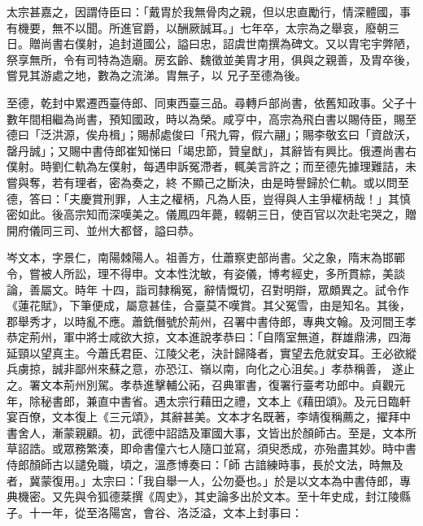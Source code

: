 \begin{pinyinscope}
 太宗甚嘉之，因謂侍臣曰：「戴胄於我無骨肉之親，但以忠直勵行，情深體國，事有機要，無不以聞。所進官爵，以酬厥誠耳。」七年卒，太宗為之舉哀，廢朝三日。贈尚書右僕射，追封道國公，謚曰忠，詔虞世南撰為碑文。又以胄宅宇弊陋，祭享無所，令有司特為造廟。房玄齡、魏徵並美胄才用，俱與之親善，及胄卒後，嘗見其游處之地，數為之流涕。胄無子，以
 兄子至德為後。



 至德，乾封中累遷西臺侍郎、同東西臺三品。尋轉戶部尚書，依舊知政事。父子十數年間相繼為尚書，預知國政，時以為榮。咸亨中，高宗為飛白書以賜侍臣，賜至德曰「泛洪源，俟舟楫」；賜郝處俊曰「飛九霄，假六翮」；賜李敬玄曰「資啟沃，罄丹誠」；又賜中書侍郎崔知悌曰「竭忠節，贊皇猷」，其辭皆有興比。俄遷尚書右僕射。時劉仁軌為左僕射，每遇申訴冤滯者，輒美言許之；而至德先據理難詰，未嘗與奪，若有理者，密為奏之，終
 不顯己之斷決，由是時譽歸於仁軌。或以問至德，答曰：「夫慶賞刑罪，人主之權柄，凡為人臣，豈得與人主爭權柄哉！」其慎密如此。後高宗知而深嘆美之。儀鳳四年薨，輟朝三日，使百官以次赴宅哭之，贈開府儀同三司、並州大都督，謚曰恭。



 岑文本，字景仁，南陽棘陽人。祖善方，仕蕭察吏部尚書。父之象，隋末為邯鄲令，嘗被人所訟，理不得申。文本性沈敏，有姿儀，博考經史，多所貫綜，美談論，善屬文。時年
 十四，詣司隸稱冤，辭情慨切，召對明辯，眾頗異之。試令作《蓮花賦》，下筆便成，屬意甚佳，合臺莫不嘆賞。其父冤雪，由是知名。其後，郡舉秀才，以時亂不應。蕭銑僭號於荊州，召署中書侍郎，專典文翰。及河間王孝恭定荊州，軍中將士咸欲大掠，文本進說孝恭曰：「自隋室無道，群雄鼎沸，四海延頸以望真主。今蕭氏君臣、江陵父老，決計歸降者，實望去危就安耳。王必欲縱兵虜掠，誠非鄙州來蘇之意，亦恐江、嶺以南，向化之心沮矣。」孝恭稱善，
 遂止之。署文本荊州別駕。孝恭進擊輔公祏，召典軍書，復署行臺考功郎中。貞觀元年，除秘書郎，兼直中書省。遇太宗行藉田之禮，文本上《藉田頌》。及元日臨軒宴百僚，文本復上《三元頌》，其辭甚美。文本才名既著，李靖復稱薦之，擢拜中書舍人，漸蒙親顧。初，武德中詔誥及軍國大事，文皆出於顏師古。至是，文本所草詔誥。或眾務繁湊，即命書僮六七人隨口並寫，須臾悉成，亦殆盡其妙。時中書侍郎顏師古以譴免職，頃之，溫彥博奏曰：「師
 古諳練時事，長於文法，時無及者，冀蒙復用。」太宗曰：「我自舉一人，公勿憂也。」於是以文本為中書侍郎，專典機密。又先與令狐德棻撰《周史》，其史論多出於文本。至十年史成，封江陵縣子。十一年，從至洛陽宮，會谷、洛泛溢，文本上封事曰：




\end{pinyinscope}
